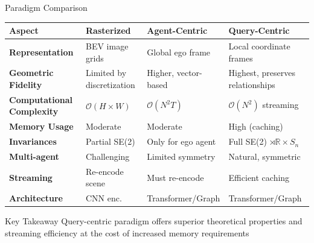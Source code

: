\documentclass[10pt,aspectratio=169]{beamer}
\begin{document}
\begin{frame}{Paradigm Comparison}
\begin{table}[ht]
\centering
\footnotesize
\begin{tabular}{|p{2cm}|p{2.5cm}|p{2.5cm}|p{2.5cm}|}
\hline
\textbf{Aspect} & \textbf{Rasterized} & \textbf{Agent-Centric} & \textbf{Query-Centric} \\
\hline
\textbf{Representation} & BEV image grids & Global ego frame & Local coordinate frames \\
\hline
\textbf{Geometric Fidelity} & Limited by discretization & Higher, vector-based & Highest, preserves relationships \\
\hline
\textbf{Computational Complexity} & $\mathcal{O}(H \times W)$ & $\mathcal{O}(N^2T)$ & $\mathcal{O}(N^2)$ streaming \\
\hline
\textbf{Memory Usage} & Moderate & Moderate & High (caching) \\
\hline
\textbf{Invariances} & Partial SE(2) & Only for ego agent & Full SE(2) $\rtimes \mathbb{R} \times S_n$ \\
\hline
\textbf{Multi-agent} & Challenging & Limited symmetry & Natural, symmetric \\
\hline
\textbf{Streaming} & Re-encode scene & Must re-encode & Efficient caching \\
\hline
\textbf{Architecture} & CNN enc. & Transformer/Graph & Transformer/Graph \\
\hline
\end{tabular}
\end{table}

\begin{block}{Key Takeaway}
Query-centric paradigm offers superior theoretical properties and streaming efficiency at the cost of increased memory requirements
\end{block}
\end{frame}

\end{document}
